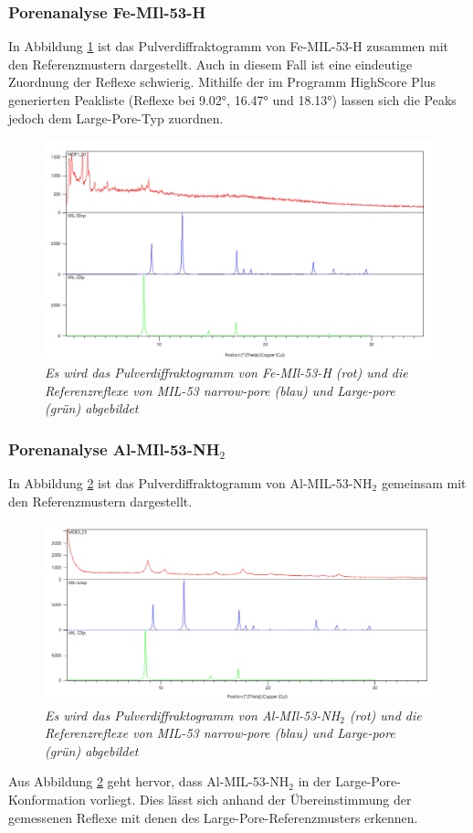 \documentclass[12pt, a4paper]{article}
\begin{document}
\subsubsection{Porenanalyse Fe-MIl-53-H}
In Abbildung \ref{MOF120ver} ist das Pulverdiffraktogramm von Fe-MIL-53-H zusammen mit den Referenzmustern dargestellt. Auch in diesem Fall ist eine eindeutige Zuordnung der Reflexe schwierig. 
Mithilfe der im Programm HighScore Plus generierten Peakliste (Reflexe bei 9.02°, 16.47° und 18.13°) lassen sich die Peaks jedoch dem Large-Pore-Typ zuordnen.
\newpage
\begin{figure}[!ht]
    \centering
    \includegraphics[scale=0.5]{MOF120ver.png}
    \caption{\textit{Es wird das Pulverdiffraktogramm von Fe-MIl-53-H (rot) und die Referenzreflexe von MIL-53 narrow-pore (blau) und Large-pore (grün) abgebildet}}
    \label{MOF120ver}
\end{figure}

\subsubsection{\texorpdfstring{Porenanalyse Al-MIl-53-NH$_2$}{Porenanalyse Al-MIl-53-NH2}}

In Abbildung \ref{MOF225ver} ist das Pulverdiffraktogramm von Al-MIL-53-NH$_2$ gemeinsam mit den Referenzmustern dargestellt. 
\begin{figure}[!h]
    \centering
    \includegraphics[scale=0.5]{MOF225ver.png}
    \caption{\textit{Es wird das Pulverdiffraktogramm von Al-MIl-53-NH$_2$ (rot) und die Referenzreflexe von MIL-53 narrow-pore (blau) und Large-pore (grün) abgebildet}}
    \label{MOF225ver}
\end{figure}
Aus Abbildung \ref{MOF225ver} geht hervor, dass Al-MIL-53-NH$_2$ in der Large-Pore-Konformation vorliegt. Dies lässt sich anhand der Übereinstimmung der gemessenen Reflexe mit denen des Large-Pore-Referenzmusters erkennen.
\end{document}
